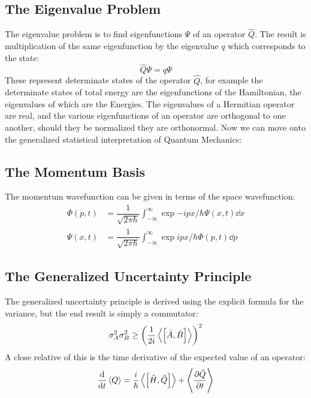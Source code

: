 \subsection{The Eigenvalue Problem}
The eigenvalue problem is to find eigenfunctions $\Psi$ of an operator $\hat{Q}$. The result is multiplication of the same eigenfunction by the eigenvalue $q$ which corresponds to the state:
\begin{equation*}
  \hat{Q}\Psi=q\Psi
\end{equation*}
These represent determinate states of the operator $\hat{Q}$, for example the determinate states of total energy are the eigenfunctions of the Hamiltonian, the eigenvalues of which are the Energies. The eigenvalues of a Hermitian operator are real, and the various eigenfunctions of an operator are orthogonal to one another, should they be normalized they are orthonormal. Now we can move onto the generalized statistical interpretation of Quantum Mechanics:
\subsection{The Momentum Basis}
The momentum wavefunction can be given in terms of the space wavefunction:
\begin{align*}
  \Phi(p,t)&=\dfrac{1}{\sqrt{2\pi\hbar}}\int_{-\infty}^\infty\exp{-ipx/\hbar}\Psi(x,t)\dd{x}
  \\
  \Psi(x,t)&=\dfrac{1}{\sqrt{2\pi\hbar}}\int_{-\infty}^{\infty}\exp{ipx/\hbar}\Phi(p,t)\dd{p}
\end{align*}
\subsection{The Generalized Uncertainty Principle}
The generalized uncertainty principle is derived using the explicit formula for the variance, but the end result is simply a commutator:
\begin{equation*}
  \sigma^2_A\sigma^2_B\geq\qty(\dfrac{1}{2i}\ev{\comm{\hat{A}}{\hat{B}}})^2
\end{equation*}
A close relative of this is the time derivative of the expected value of an operator:
\begin{equation*}
  \dv{t}\ev{Q}=\dfrac{i}{\hbar}\ev{\comm{\hat{H}}{\hat{Q}}}+\ev{\pdv{\hat{Q}}{t}}
\end{equation*}
